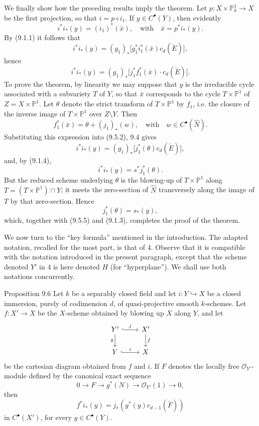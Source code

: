 We finally show how the preceding results imply the theorem. Let $p:X\times\mathbb P^1_k\to X$ be the first projection, so that $i=p\circ i_1$. If $y\in C^{\bullet}(Y)$, then evidently
\[
i^*i_*(y)=(i_1)^*(\bar x),\quad\text{with}\quad \bar x=p^*i_*(y).
\tag{9.5.1}
\]
By (9.1.1) it follows that
\[
i^*i_*(y)=(g_1)_*\bigl[g_1^*i_1^*(\bar x)c_d(\check E)\bigr],
\]
hence
\[
i^*i_*(y)=(g_1)_*\bigl[j_1^*f_1^*(\bar x)\cdot c_d(\check E)\bigr].
\tag{9.5.2}
\]
To prove the theorem, by linearity we may suppose that $y$ is the irreducible cycle associated with a subvariety $T$ of $Y$, so that $\bar x$ corresponds to the cycle $T\times\mathbb P^1$ of $Z=X\times\mathbb P^1$. Let $\theta$ denote the strict transform of $T\times\mathbb P^1$ by $f_1$, i.e. the closure of the inverse image of $T\times\mathbb P^1$ over $Z\setminus Y$. Then
\[
f_1^*(\bar x)=\theta+(j_1)_*(w),\quad\text{with}\quad w\in C^{\bullet}(\widehat N).
\tag{9.5.3}
\]
Substituting this expression into (9.5.2), 9.4 gives
\[
i^*i_*(y)=(g_1)_*\bigl[j_1^*(\theta)c_d(\check E)\bigr],
\tag{9.5.4}
\]
and, by (9.1.4),
\[
i^*i_*(y)=s^*j_1^*(\theta).
\tag{9.5.5}
\]
But the reduced scheme underlying $\theta$ is the blowing-up of $T\times\mathbb P^1$ along $T=(T\times\mathbb P^1)\cap Y$; it meets the zero-section of $\widehat N$ transversely along the image of $T$ by that zero-section. Hence
\[
j_1^*(\theta)=s_*(y),
\]
which, together with (9.5.5) and (9.1.3), completes the proof of the theorem.

We now turn to the ``key formula'' mentioned in the introduction. The adapted notation, recalled for the most part, is that of 4. Observe that it is compatible with the notation introduced in the present paragraph, except that the scheme denoted $Y'$ in 4 is here denoted $H$ (for ``hyperplane''). We shall use both notations concurrently.

\begin{statement}{Proposition 9.6}
Let $k$ be a separably closed field and let $i:Y\hookrightarrow X$ be a closed immersion, purely of codimension $d$, of quasi-projective smooth $k$-schemes. Let $f:X'\to X$ be the $X$-scheme obtained by blowing up $X$ along $Y$, and let
\[
\begin{tikzcd}
Y'\arrow[r,hook,"j"]\arrow[d,"g"']&X'\arrow[d,"f"]\\
Y\arrow[r,hook,"i"]&X
\end{tikzcd}
\]
be the cartesian diagram obtained from $f$ and $i$. If $F$ denotes the locally free $\mathcal O_{Y'}$-module defined by the canonical exact sequence
\[
0\to F\to g^*(N)\to\mathcal O_{Y'}(1)\to0,
\tag{9.6.1}
\]
then
\[
f^*i_*(y)=j_*(g^*(y)c_{d-1}(\check F))
\tag{9.6.2}
\]
in $C^{\bullet}(X')$, for every $y\in C^{\bullet}(Y)$.
\end{statement}

